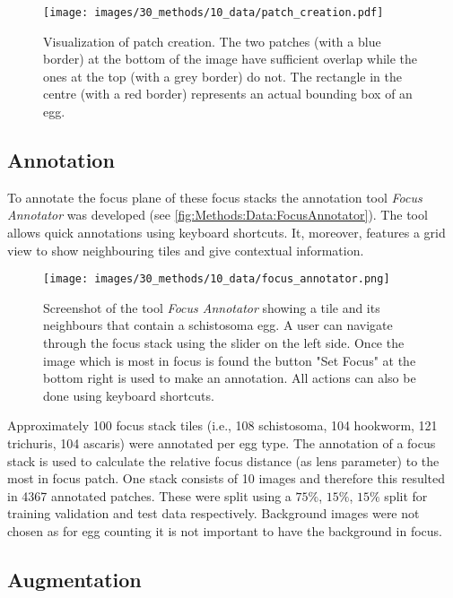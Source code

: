 \begin{figure}
    \centering
    \texttt{[image: images/30\_methods/10\_data/patch\_creation.pdf]}
    \caption[Patch creation]{Visualization of patch creation. The two patches (with a blue border) at the bottom of the image have sufficient overlap while the ones at the top (with a grey border) do not. The rectangle in the centre (with a red border) represents an actual bounding box of an egg.}
    \label{fig:Methods:Data:PatchCreation}
\end{figure}



\subsection{Annotation}
\label{sec:Methods:Data:Annotation}

To annotate the focus plane of these focus stacks the annotation tool \emph{Focus Annotator} \cite{kuchelmeister2022focus} was developed (see \autoref{fig:Methods:Data:FocusAnnotator}). The tool allows quick annotations using keyboard shortcuts. It, moreover, features a grid view to show neighbouring tiles and give contextual information.

\begin{figure}
    \centering
    \texttt{[image: images/30\_methods/10\_data/focus\_annotator.png]}
    \caption[Screenshot of Focus Annotator ]{Screenshot of the tool \emph{Focus Annotator} showing a tile and its neighbours that contain a schistosoma egg. A user can navigate through the focus stack using the slider on the left side. Once the image which is most in focus is found the button "Set Focus" at the bottom right is used to make an annotation. All actions can also be done using keyboard shortcuts.}
    \label{fig:Methods:Data:FocusAnnotator}
\end{figure}


Approximately 100 focus stack tiles (i.e., 108 schistosoma, 104 hookworm, 121 trichuris, 104 ascaris) were annotated per egg type. The annotation of a focus stack is used to calculate the relative focus distance (as lens parameter) to the most in focus patch. One stack consists of 10 images and therefore this resulted in 4367 annotated patches. These were split using a $75\%$, $15\%$, $15\%$ split for training validation and test data respectively. Background images were not chosen as for egg counting it is not important to have the background in focus.

\subsection{Augmentation}
\label{sec:Methods:Data:Augmentation}

